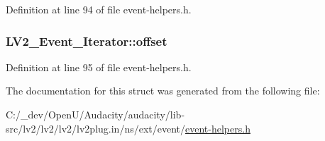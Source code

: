 Definition at line 94 of file event-\/helpers.\+h.

\subsubsection[{\texorpdfstring{offset}{offset}}]{ L\+V2\+\_\+\+Event\+\_\+\+Iterator\+::offset}\hypertarget{struct_l_v2___event___iterator_a5d47db3ab1017ebee8c7ed56fe88b801}{}\label{struct_l_v2___event___iterator_a5d47db3ab1017ebee8c7ed56fe88b801}


Definition at line 95 of file event-\/helpers.\+h.



The documentation for this struct was generated from the following file\+:\begin{DoxyCompactItemize}
\item 
C\+:/\+\_\+dev/\+Open\+U/\+Audacity/audacity/lib-\/src/lv2/lv2/lv2/lv2plug.\+in/ns/ext/event/\hyperlink{event-helpers_8h}{event-\/helpers.\+h}\end{DoxyCompactItemize}
